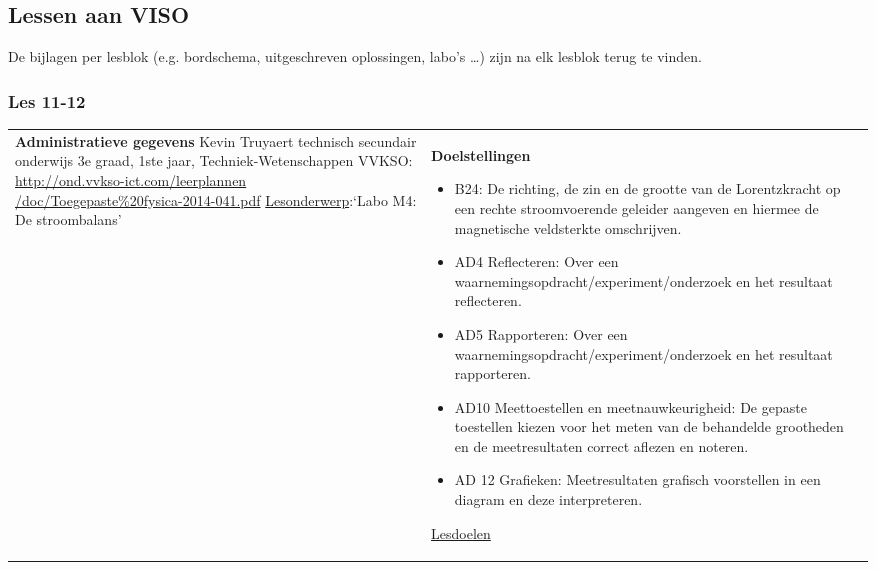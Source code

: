 


\begin{landscape}
	\subsection{Lessen aan VISO}
	De bijlagen per lesblok (e.g. bordschema, uitgeschreven oplossingen, labo's \ldots) zijn na elk lesblok terug te vinden. 
	\subsubsection{Les 11-12}
	\begin{tabularx}{1.56\textwidth}{|p{}|X|}\hline
		\textbf{Administratieve gegevens}\newline\newline
		Kevin Truyaert\newline\newline
		technisch secundair onderwijs\newline
		3e graad, 1ste jaar, Techniek-Wetenschappen\newline
		VVKSO: \href{http://ond.vvkso-ict.com/leerplannen/doc/Toegepaste\%20fysica-2014-041.pdf}{http://ond.vvkso-ict.com/leerplannen /doc/Toegepaste\%20fysica-2014-041.pdf} \newline
		\underline{Lesonderwerp}:\newline `Labo M4: De stroombalans' & \textbf{Doelstellingen}
		\begin{itemize}[itemsep=0.08\baselineskip]
			\item B24: De richting, de zin en de grootte van de Lorentzkracht op een rechte stroomvoerende geleider aangeven en hiermee de magnetische veldsterkte omschrijven. 
			\item AD4 Reflecteren: Over een waarnemingsopdracht/experiment/onderzoek en het resultaat reflecteren.
			\item AD5 Rapporteren: Over een waarnemingsopdracht/experiment/onderzoek en het resultaat rapporteren.
			\item AD10 Meettoestellen en meetnauwkeurigheid: De gepaste toestellen kiezen voor het meten van de behandelde grootheden en de meetresultaten correct aflezen en noteren.
			\item AD 12 Grafieken: Meetresultaten grafisch voorstellen in een diagram en deze interpreteren.
		\end{itemize}
		\underline{Lesdoelen}\newline

\end{tabularx}
\end{landscape}
